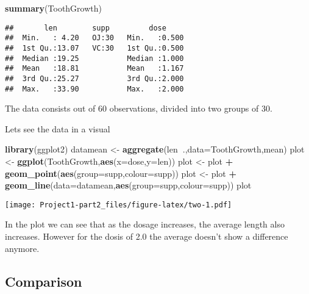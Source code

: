 \documentclass[
]{article}
\newenvironment{Shaded}{\begin{snugshade}}{\end{snugshade}}
\newcommand{\DataTypeTok}[1]{\textcolor[rgb]{0.13,0.29,0.53}{#1}}
\newcommand{\KeywordTok}[1]{\textcolor[rgb]{0.13,0.29,0.53}{\textbf{#1}}}
\newcommand{\NormalTok}[1]{#1}
\newcommand{\OperatorTok}[1]{\textcolor[rgb]{0.81,0.36,0.00}{\textbf{#1}}}
\newcommand{\StringTok}[1]{\textcolor[rgb]{0.31,0.60,0.02}{#1}}
\begin{document}
\begin{Shaded}
\begin{Highlighting}[]
\KeywordTok{summary}\NormalTok{(ToothGrowth)}
\end{Highlighting}
\end{Shaded}

\begin{verbatim}
##       len        supp         dose      
##  Min.   : 4.20   OJ:30   Min.   :0.500  
##  1st Qu.:13.07   VC:30   1st Qu.:0.500  
##  Median :19.25           Median :1.000  
##  Mean   :18.81           Mean   :1.167  
##  3rd Qu.:25.27           3rd Qu.:2.000  
##  Max.   :33.90           Max.   :2.000
\end{verbatim}

The data consists out of 60 observations, divided into two groups of 30.

Lets see the data in a visual

\begin{Shaded}
\begin{Highlighting}[]
\KeywordTok{library}\NormalTok{(ggplot2)}
\NormalTok{datamean <-}\StringTok{ }\KeywordTok{aggregate}\NormalTok{(len}\OperatorTok{~}\NormalTok{.,}\DataTypeTok{data=}\NormalTok{ToothGrowth,mean)}
\NormalTok{plot <-}\StringTok{ }\KeywordTok{ggplot}\NormalTok{(ToothGrowth,}\KeywordTok{aes}\NormalTok{(}\DataTypeTok{x=}\NormalTok{dose,}\DataTypeTok{y=}\NormalTok{len))}
\NormalTok{plot <-}\StringTok{ }\NormalTok{plot }\OperatorTok{+}\StringTok{ }\KeywordTok{geom_point}\NormalTok{(}\KeywordTok{aes}\NormalTok{(}\DataTypeTok{group=}\NormalTok{supp,}\DataTypeTok{colour=}\NormalTok{supp))}
\NormalTok{plot <-}\StringTok{ }\NormalTok{plot }\OperatorTok{+}\StringTok{ }\KeywordTok{geom_line}\NormalTok{(}\DataTypeTok{data=}\NormalTok{datamean,}\KeywordTok{aes}\NormalTok{(}\DataTypeTok{group=}\NormalTok{supp,}\DataTypeTok{colour=}\NormalTok{supp))}
\NormalTok{plot}
\end{Highlighting}
\end{Shaded}

\texttt{[image: Project1-part2\_files/figure-latex/two-1.pdf]}

In the plot we can see that as the dosage increases, the average length
also increases. However for the dosis of 2.0 the average doesn't show a
difference anymore.

\hypertarget{comparison}{%
\subsection{Comparison}\label{comparison}}
\end{document}
